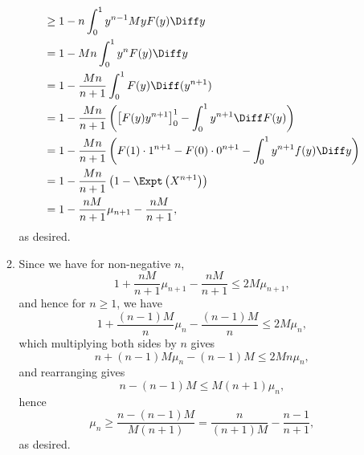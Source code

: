 \begin{enumerate}
\begin{enumerate}
\begin{align*}
                                              & \geq 1 - n \int_{0}^{1} y^{n - 1} My F(y) \Diff y                                                                     \\
                                              & = 1 - M n \int_{0}^{1} y^n F(y) \Diff y                                                                               \\
                                              & = 1 - \frac{Mn}{n + 1} \int_{0}^{1} F(y) \Diff (y^{n + 1})                                                            \\
                                              & = 1 - \frac{Mn}{n + 1} \left(\left[F(y) y^{n + 1}\right]_{0}^{1} - \int_{0}^{1} y^{n + 1} \Diff F(y)\right)           \\
                                              & = 1 - \frac{Mn}{n + 1} \left(F(1) \cdot 1^{n + 1} - F(0) \cdot 0^{n + 1} - \int_{0}^{1} y^{n + 1} f(y) \Diff y\right) \\
                                              & = 1 - \frac{Mn}{n + 1} \left(1 - \Expt\left(X^{n + 1}\right)\right)                                                   \\
                                              & = 1 - \frac{nM}{n + 1}\mu_{n + 1} - \frac{nM}{n + 1},
                    \end{align*}
                    as desired.
              \item Since we have for non-negative \(n\),
                    \[
                        1 + \frac{nM}{n + 1}\mu_{n + 1} - \frac{nM}{n + 1} \leq 2M \mu_{n + 1},
                    \]
                    and hence for \(n \geq 1\), we have
                    \[
                        1 + \frac{(n - 1)M}{n} \mu_n - \frac{(n - 1)M}{n} \leq 2M \mu_n,
                    \]
                    which multiplying both sides by \(n\) gives
                    \[
                        n + (n - 1)M \mu_n - (n - 1)M \leq 2Mn \mu_n,
                    \]
                    and rearranging gives
                    \[
                        n - (n - 1) M \leq M(n + 1) \mu_n,
                    \]
                    hence
                    \[
                        \mu_n \geq \frac{n - (n - 1)M}{M(n + 1)} = \frac{n}{(n + 1)M} - \frac{n - 1}{n + 1},
                    \]
                    as desired.
          \end{enumerate}
\end{enumerate}